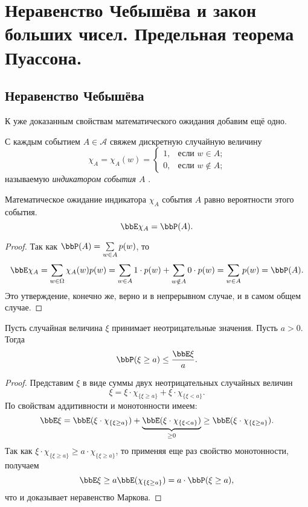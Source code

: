 \chapter{Неравенство Чебышёва и закон больших чисел. Предельная теорема Пуассона.}
\section{Неравенство Чебышёва}

К уже доказанным свойствам математического ожидания добавим ещё одно.
\begin{defn}
С каждым событием $A \in \mathcal{A}$ свяжем дискретную случайную величину
$$
\chi_A =\chi_A(w)=\begin{cases}
1,&\text{если $w \in A$;}\\
0,&\text{если $w \notin A$;}
\end{cases}
$$
называемую \textit{индикатором события $A$} .
\end{defn}
\begin{thm}
Математическое ожидание индикатора $\chi_A$ события $A$ равно вероятности этого события.
$$
\bbE\chi_A=\bbP(A).
$$ 
\end{thm}
\begin{proof}
Так как $\bbP(A)=\sum\limits_{w\in A}p(w)$, то 
$$
\bbE\chi_A=\sum\limits_{w\in\Omega}\chi_A(w)p(w)=\sum\limits_{w\in A}1\cdot p(w)+\sum\limits_{w\notin A}0\cdot p(w)=\sum\limits_{w\in A}p(w)=\bbP(A).
$$
Это утверждение, конечно же, верно и в непрерывном случае, и в самом общем случае.
\end{proof}

\begin{thm}
Пусть случайная величина $\xi$ принимает неотрицательные значения. Пусть $a>0$. Тогда 
$$
\bbP(\xi \ge a)\le\frac{\bbE\xi}{a}.
$$
\end{thm}
\begin{proof}
Представим $\xi$ в виде суммы двух неотрицательных случайных величин
$$
\xi = \xi\cdot\chi_{\{\xi\ge a\}}+\xi\cdot\chi_{\{\xi< a\}}.
$$
По свойствам аддитивности и монотонности имеем:
$$
\bbE \xi=\bbE (\xi\cdot\chi_{\{\xi\ge a\}})+\underbrace{\bbE (\xi\cdot\chi_{\{\xi< a\}})}_{\ge 0} \ge \bbE (\xi\cdot\chi_{\{\xi\ge a\}}).
$$
Так как $\xi\cdot\chi_{\{\xi\ge a\}}\ge a\cdot\chi_{\{\xi\ge a\}}$, то применяя еще раз свойство монотонности, получаем
$$
\bbE \xi\ge a\bbE (\chi_{\{\xi\ge a\}})=a\cdot \bbP(\xi\ge a),
$$
что и доказывает неравенство Маркова.
\end{proof}

